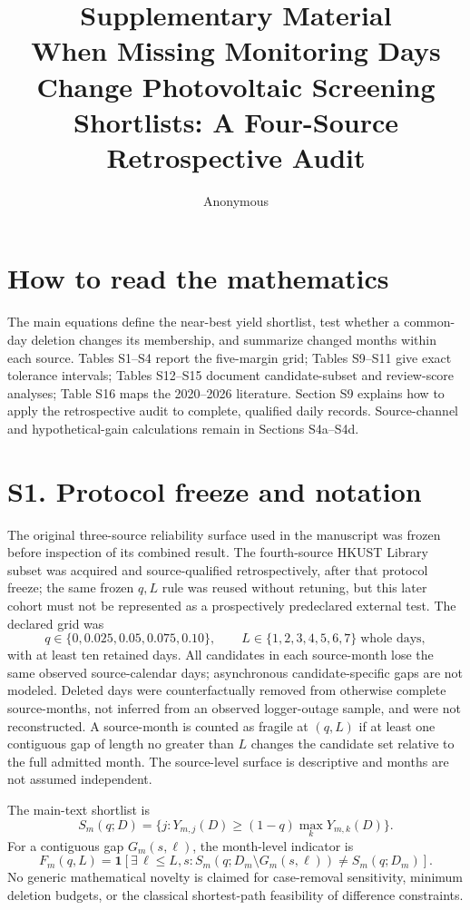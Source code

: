\documentclass[11pt]{article}
\title{\textbf{Supplementary Material}\\[0.4em]
\large When Missing Monitoring Days Change Photovoltaic Screening Shortlists: A Four-Source Retrospective Audit}
\author{Anonymous}
\date{}
\begin{document}
\maketitle

\section*{How to read the mathematics}
The main equations define the near-best yield shortlist, test whether a common-day deletion changes its membership, and summarize changed months within each source. Tables S1--S4 report the five-margin grid; Tables S9--S11 give exact tolerance intervals; Tables S12--S15 document candidate-subset and review-score analyses; Table S16 maps the 2020--2026 literature. Section S9 explains how to apply the retrospective audit to complete, qualified daily records. Source-channel and hypothetical-gain calculations remain in Sections S4a--S4d.

\section*{S1. Protocol freeze and notation}
The original three-source reliability surface used in the manuscript was frozen before inspection of its combined result. The fourth-source HKUST Library subset was acquired and source-qualified retrospectively, after that protocol freeze; the same frozen $q,L$ rule was reused without retuning, but this later cohort must not be represented as a prospectively predeclared external test. The declared grid was
\[
q\in\{0,0.025,0.05,0.075,0.10\},\qquad L\in\{1,2,3,4,5,6,7\}\;\text{whole days},
\]
with at least ten retained days. All candidates in each source-month lose the same observed source-calendar days; asynchronous candidate-specific gaps are not modeled. Deleted days were counterfactually removed from otherwise complete source-months, not inferred from an observed logger-outage sample, and were not reconstructed. A source-month is counted as fragile at $(q,L)$ if at least one contiguous gap of length no greater than $L$ changes the candidate set relative to the full admitted month. The source-level surface is descriptive and months are not assumed independent.

The main-text shortlist is
\[
S_m(q;D)=\{j:Y_{m,j}(D)\ge (1-q)\max_kY_{m,k}(D)\}.
\]
For a contiguous gap $G_m(s,\ell)$, the month-level indicator is
\[
F_m(q,L)=\mathbf{1}[\exists\,\ell\le L,s: S_m(q;D_m\setminus G_m(s,\ell))\ne S_m(q;D_m)].
\]
No generic mathematical novelty is claimed for case-removal sensitivity, minimum deletion budgets, or the classical shortest-path feasibility of difference constraints.
\end{document}

